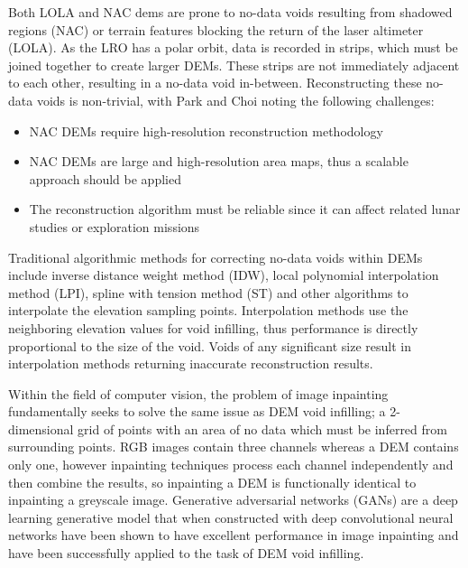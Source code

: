 \documentclass[twocolumn]{article}
\begin{document}
Both LOLA and NAC dems are prone to no-data voids resulting from shadowed regions (NAC) or terrain features blocking the return of the laser altimeter (LOLA).
As the LRO has a polar orbit, data is recorded in strips, which must be joined together to create larger DEMs. These strips are not immediately adjacent to each other, resulting in a no-data void in-between.
Reconstructing these no-data voids is non-trivial, with Park and Choi \autocite{parkNeuralProcessApproach2021}  noting the following challenges:
\begin{itemize}
\item NAC DEMs require high-resolution reconstruction methodology
\item NAC DEMs are large and high-resolution area maps, thus a scalable approach should be applied
\item The reconstruction algorithm must be reliable since it can affect related lunar studies or exploration missions
\end{itemize}

Traditional algorithmic methods for correcting no-data voids within DEMs include inverse distance weight method (IDW), local polynomial interpolation method (LPI), spline with tension method (ST) and other algorithms to interpolate the elevation sampling points. Interpolation methods use the neighboring elevation values for void infilling, thus performance is directly proportional to the size of the void.
Voids of any significant size result in interpolation methods returning inaccurate reconstruction results.  \autocite{reuterEvaluationVoidFilling2007}

Within the field of computer vision, the problem of image inpainting fundamentally seeks to solve the same issue as DEM void infilling; a 2-dimensional grid of points with an area of no data which must be inferred from surrounding points.
RGB images contain three channels whereas a DEM contains only one, however inpainting techniques process each channel independently and then combine the results, so inpainting a DEM is functionally identical to inpainting a greyscale image.
Generative adversarial networks (GANs)\autocite{goodfellowGenerativeAdversarialNetworks2020} are a deep learning generative model that when constructed with deep convolutional neural networks\autocite{krizhevskyImageNetClassificationDeep2017} have been shown to have excellent performance in image inpainting\autocite{pathakContextEncodersFeature2016,yuGenerativeImageInpainting2018} and have been successfully applied to the task of DEM void infilling\autocite{gavriilVoidFillingDigital2019,zhangVoidFillingBased2020,qiuVoidFillingDigital2019}.
\end{document}
